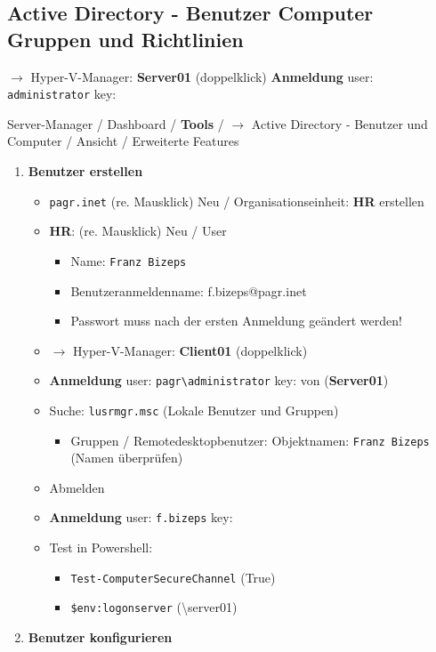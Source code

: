 \subsection{Active Directory - Benutzer Computer Gruppen und
Richtlinien}\label{active-directory-benutzer-computer-gruppen-und-richtlinien}

$\to$ Hyper-V-Manager: \textbf{Server01} (doppelklick)
\textbf{Anmeldung} user: \verb|administrator| key:

Server-Manager / Dashboard / \textbf{Tools} / $\to$ Active Directory -
Benutzer und Computer / Ansicht / Erweiterte Features

\begin{enumerate}
\item
  \textbf{Benutzer erstellen}

  \begin{itemize}
  \item
    \verb|pagr.inet| (re. Mausklick) Neu /
    Organisationseinheit: \textbf{HR} erstellen
  \item
    \textbf{HR}: (re. Mausklick) Neu / User

    \begin{itemize}
    \item
      Name: \verb|Franz Bizeps|
    \item
      Benutzeranmeldenname: f.bizeps@pagr.inet
    \item
      Passwort muss nach der ersten Anmeldung geändert werden!
    \end{itemize}
  \item
    $\to$ Hyper-V-Manager: \textbf{Client01} (doppelklick)
  \item
    \textbf{Anmeldung} user:
    \verb|pagr\administrator| key: von
    (\textbf{Server01})
  \item
    Suche: \verb|lusrmgr.msc| (Lokale Benutzer und
    Gruppen)

    \begin{itemize}
    \item
      Gruppen / Remotedesktopbenutzer: Objektnamen:
      \verb|Franz Bizeps| (Namen überprüfen)
    \end{itemize}
  \item
    Abmelden
  \item
    \textbf{Anmeldung} user: \verb|f.bizeps| key:
  \item
    Test in Powershell:

    \begin{itemize}
    \item
      \verb|Test-ComputerSecureChannel| (True)
    \item
      \verb|$env:logonserver|
      (\textbackslash server01)
    \end{itemize}
  \end{itemize}
\item
  \textbf{Benutzer konfigurieren}


\end{enumerate}
